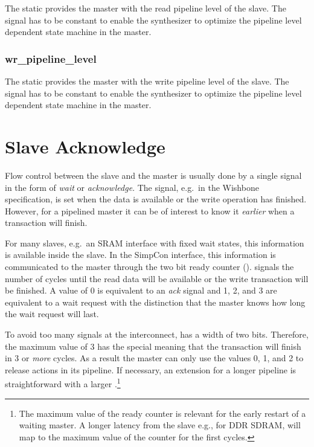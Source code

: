 The static  provides the master with the
read pipeline level of the slave. The signal has to be constant to
enable the synthesizer to optimize the pipeline level dependent
state machine in the master.


\subsubsection{wr\_pipeline\_level}

The static  provides the master with the
write pipeline level of the slave. The signal has to be constant to
enable the synthesizer to optimize the pipeline level dependent
state machine in the master.

\section{Slave Acknowledge}
\label{sec:ack} 

Flow control between the slave and the master is usually done by a
single signal in the form of \emph{wait} or \emph{acknowledge}. The
 signal, e.g.\ in the Wishbone specification, is set when
the data is available or the write operation has finished. However,
for a pipelined master it can be of interest to know it
\emph{earlier} when a transaction will finish.

For many slaves, e.g.\ an SRAM interface with fixed wait states, this
information is available inside the slave. In the SimpCon interface,
this information is communicated to the master through the two bit
ready counter ().  signals the number
of cycles until the read data will be available or the write
transaction will be finished. A value of 0 is equivalent to an
\emph{ack} signal and 1, 2, and 3 are equivalent to a wait request
with the distinction that the master knows how long the wait request
will last.

To avoid too many signals at the interconnect,  has a
width of two bits. Therefore, the maximum value of 3 has the special
meaning that the transaction will finish in 3 or \emph{more} cycles.
As a result the master can only use the values 0, 1, and 2 to release
actions in its pipeline. If necessary, an extension for a longer
pipeline is straightforward with a larger
.\footnote{The maximum value of the ready counter is
relevant for the early restart of a waiting master. A longer latency
from the slave e.g., for DDR SDRAM, will map to the maximum value of
the counter for the first cycles.}

